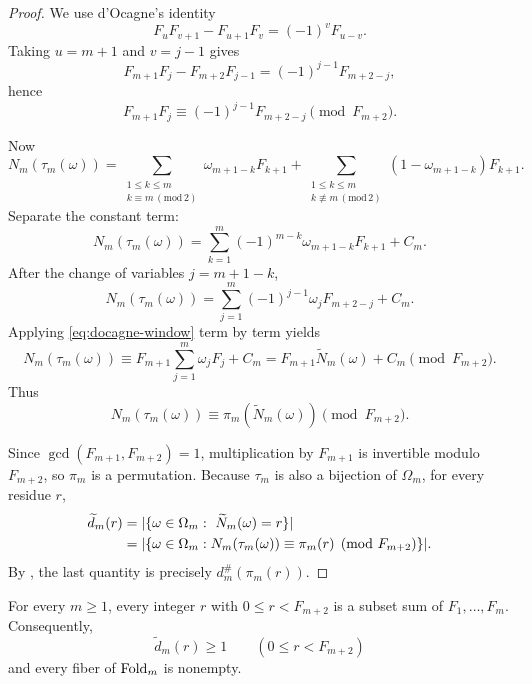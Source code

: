 \begin{proof}
We use d'Ocagne's identity
\[
  F_uF_{v+1}-F_{u+1}F_v=(-1)^vF_{u-v}.
\]
Taking \(u=m+1\) and \(v=j-1\) gives
\[
  F_{m+1}F_j-F_{m+2}F_{j-1}=(-1)^{j-1}F_{m+2-j},
\]
hence
\begin{equation}\label{eq:docagne-window}
  F_{m+1}F_j\equiv (-1)^{j-1}F_{m+2-j}\pmod{F_{m+2}}.
\end{equation}

Now
\[
  N_m(\tau_m(\omega))
  =
  \sum_{\substack{1\le k\le m\\ k\equiv m \,(\mathrm{mod}\,2)}}
  \omega_{m+1-k}F_{k+1}
  +
  \sum_{\substack{1\le k\le m\\ k\not\equiv m \,(\mathrm{mod}\,2)}}
  (1-\omega_{m+1-k})F_{k+1}.
\]
Separate the constant term:
\[
  N_m(\tau_m(\omega))
  =
  \sum_{k=1}^m(-1)^{m-k}\omega_{m+1-k}F_{k+1}+C_m.
\]
After the change of variables \(j=m+1-k\),
\[
  N_m(\tau_m(\omega))
  =
  \sum_{j=1}^m(-1)^{j-1}\omega_jF_{m+2-j}+C_m.
\]
Applying \eqref{eq:docagne-window} term by term yields
\[
  N_m(\tau_m(\omega))
  \equiv
  F_{m+1}\sum_{j=1}^m \omega_jF_j + C_m
  =
  F_{m+1}\widetilde N_m(\omega)+C_m
  \pmod{F_{m+2}}.
\]
Thus
\begin{equation}\label{eq:tau-congruence}
  N_m(\tau_m(\omega))\equiv \pi_m(\widetilde N_m(\omega))\pmod{F_{m+2}}.
\end{equation}

Since \(\gcd(F_{m+1},F_{m+2})=1\), multiplication by \(F_{m+1}\) is invertible
modulo \(F_{m+2}\), so \(\pi_m\) is a permutation.  Because \(\tau_m\) is also
a bijection of \(\Omega_m\), for every residue \(r\),
\begin{align*}
  \widetilde d_m(r)
  &=
  \lvert \{\omega\in\Omega_m:\ \widetilde N_m(\omega)=r\} \rvert \\
  &=
  \lvert 
    \left\{
      \omega\in\Omega_m:
      N_m(\tau_m(\omega))\equiv \pi_m(r)\pmod{F_{m+2}}
    \right\}
   \rvert.
\end{align*}
By , the last quantity is precisely
\(d_m^\#(\pi_m(r))\).
\end{proof}

\begin{intervalcompletenesslemma}
For every \(m\ge1\), every integer \(r\) with \(0\le r<F_{m+2}\) is a
subset sum of \(F_1,\ldots,F_m\).  Consequently,
\[
  \widetilde d_m(r)\ge1\qquad(0\le r<F_{m+2})
\]
and every fiber of \(\mathrm{Fold}_m\) is nonempty.
\end{intervalcompletenesslemma}

